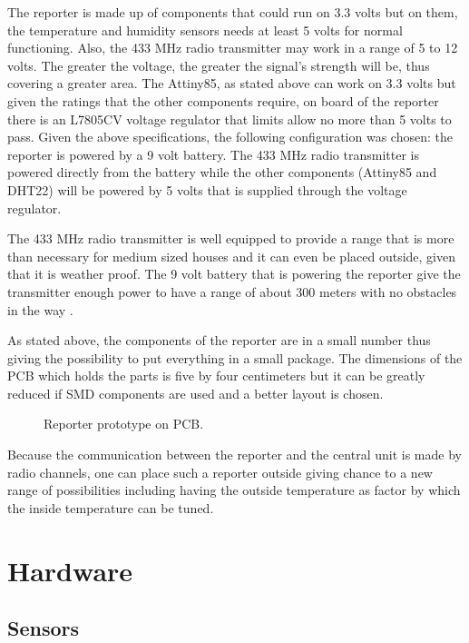 The reporter is made up of components that could run on 3.3 volts but on them, the temperature and humidity
sensors needs at least 5 volts for normal functioning. Also, the 433 MHz radio transmitter may work in a range
of 5 to 12 volts. The greater the voltage, the greater the signal's strength will be, thus covering a greater
area. The Attiny85, as stated above can work on 3.3 volts but given the ratings that the other components
require, on board of the reporter there is an L7805CV voltage regulator that limits allow no more than
5 volts to pass. Given the above specifications, the following configuration was chosen: the reporter is
powered by a 9 volt battery. The 433 MHz radio transmitter is powered directly from the battery while the
other components (Attiny85 and DHT22) will be powered by 5 volts that is supplied through the voltage
regulator.

The 433 MHz radio transmitter is well equipped to provide a range that is more than necessary for medium
sized houses and it can even be placed outside, given that it is weather proof. The 9 volt battery that is
powering the reporter give the transmitter enough power to have a range of about 300 meters with no obstacles
in the way \cite{datasheet:radio_tx}.

\qquad As stated above, the components of the reporter are in a small number thus giving the possibility to put
everything in a small package. The dimensions of the PCB which holds the parts is five by four centimeters
but it can be greatly reduced if SMD components are used and a better layout is chosen.

\begin{figure}[h!]
    \label{fig:reporter}
    \centerline{}
    \caption[Reporter Prototype On PCB]{Reporter prototype on PCB.}
    \label{fig:reporter}
\end{figure}

Because the communication between the reporter and the central unit is made by radio channels, one can place
such a reporter outside giving chance to a new range of possibilities including having the outside temperature
as factor by which the inside temperature can be tuned.

\section{Hardware}

\subsection{Sensors}
\label{sec:sensors}

